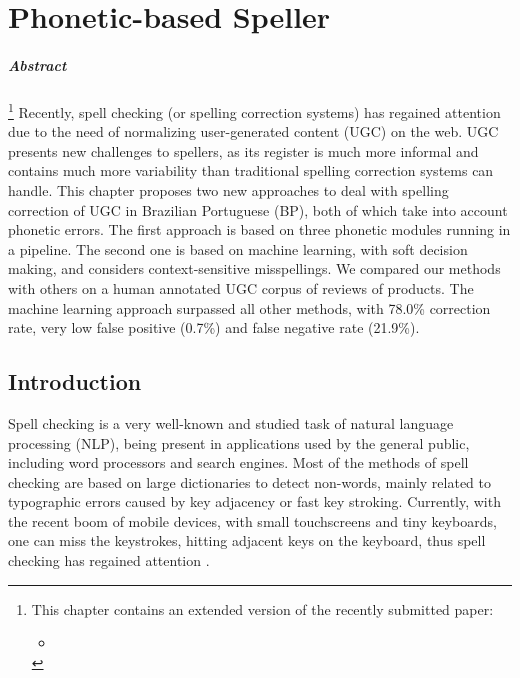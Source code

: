 \chapter{Phonetic-based Speller}\label{ch:speller}

\paragraph{Abstract}
\footnote{This chapter contains an extended version of the recently submitted paper:

\begin{itemize}
 \item {}
\end{itemize}}
Recently, spell checking (or spelling correction systems) has regained attention 
due to the need of normalizing user-generated content (UGC) on the web. UGC presents 
new challenges to spellers, as its register is much more informal and contains much
more variability than traditional spelling correction systems can handle. This chapter proposes 
two new approaches to deal with spelling correction of UGC in Brazilian Portuguese (BP), 
both of which take into account phonetic errors. The first approach is based on three phonetic
modules running in a pipeline. The second one is based on machine learning, with soft decision 
making, and considers context-sensitive misspellings. We compared our methods with 
others on a human annotated UGC corpus of reviews of products. The machine learning approach surpassed 
all other methods, with 78.0\% correction rate, very low false positive (0.7\%) and false 
negative rate (21.9\%). 

\section{Introduction}

Spell checking is a very well-known and studied task of natural language processing (NLP), being present in applications used by the general public, including word processors and search engines. Most of the methods of spell checking are based on large dictionaries to detect non-words, mainly related to typographic errors caused by key adjacency or fast key stroking. 
Currently, with the recent boom of mobile devices, with small touchscreens and tiny keyboards, one can miss the keystrokes, hitting adjacent keys on the keyboard, thus spell checking has regained attention \cite{Duan2011}.   

